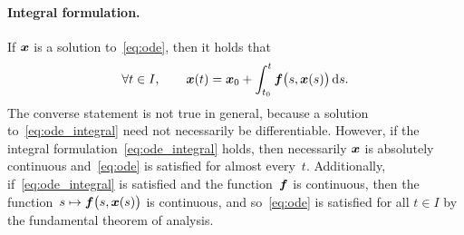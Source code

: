 \paragraph{Integral formulation.}
If $\mathbf{\boldsymbol{x}}$ is a solution to~\eqref{eq:ode},
then it holds that
\begin{equation}
    \label{eq:ode_integral}
    \forall  t \in I, \qquad
    \mathbf{\boldsymbol{x}}(t) = \mathbf{\boldsymbol{x}}_0 + \int_{t_0}^{t} \mathbf{\boldsymbol{f}}\bigl(s, \mathbf{\boldsymbol{x}}(s)\bigr) \, \mathrm d s.
\end{equation}
The converse statement is not true in general,
because a solution to~\eqref{eq:ode_integral} need not necessarily be differentiable.
However, if the integral formulation~\eqref{eq:ode_integral} holds,
then necessarily $\mathbf{\boldsymbol{x}}$ is absolutely continuous
and~\eqref{eq:ode} is satisfied for almost every~$t$.
Additionally, if~\eqref{eq:ode_integral} is satisfied and the function~$\mathbf{\boldsymbol{f}}$ is continuous,
then the function~$s \mapsto \mathbf{\boldsymbol{f}}\bigl(s, \mathbf{\boldsymbol{x}}(s)\bigr)$ is continuous,
and so~\eqref{eq:ode} is satisfied for all $t \in I$ by the fundamental theorem of analysis.

